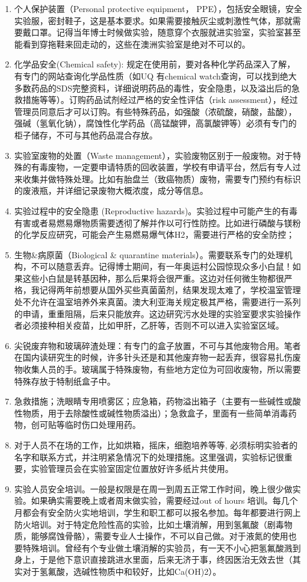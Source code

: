 \documentclass[]{book}
\begin{document}
\begin{enumerate}
\def\labelenumi{\alph{enumi}.}
\item
  个人保护装置（Personal protective equipment， PPE），包括安全眼镜，安全实验服，密封鞋子，这是基本要求。如果需要接触灰尘或刺激性气体，那就需要戴口罩。记得当年博士时候做实验，随意穿个衣服就进实验室，实验室甚至能看到穿拖鞋来回走动的，这些在澳洲实验室是绝对不可以的。
\item
  化学品安全(Chemical safety): 规定在使用前，要对各种化学药品深入了解，有专门的网站查询化学品性质（如UQ 有chemical watch查询，可以找到绝大多数药品的SDS完整资料，详细说明药品的毒性，安全隐患，以及溢出后的急救措施等等）。订购药品试剂经过严格的安全性评估（risk assessment），经过管理员同意后才可以订购。有些特殊药品，如强酸（浓硫酸，硝酸，盐酸），强碱（氢氧化钠），腐蚀性化学药品（高锰酸钾，高氯酸钾等）必须有专门的柜子储存，不可与其他药品混合存放。
\item
  实验室废物的处置（Waste management），实验废物区别于一般废物。对于特殊的有毒废物，一定要申请特质的回收装置，学校有申请平台，然后有专人过来收集并做特殊处理。比如有胎盘兰（致癌物质）废物，需要专门预约有标识的废液瓶，并详细记录废物大概浓度，成分等信息。
\item
  实验过程中的安全隐患 (Reproductive hazards)。实验过程中可能产生的有毒有害或者易燃易爆物质需要透彻了解并作以可行性防控。比如进行磷酸与镁粉的化学反应研究，可能会产生易燃易爆气体H2，需要进行严格的安全防控；
\item
  生物\&病原菌（Biological \& quarantine materials）。需要联系专门的处理机构，不可以随意丢弃。记得博士期间，有一年奥运村公园惊现众多小白鼠！如果这些小白鼠是转基因种，那么后果将会很严重。这边对任何微生物都很严格，我记得两年前想要从国外买些真菌菌剂，结果发现太难了，学校温室管理处不允许在温室培养外来真菌。澳大利亚海关规定极其严格，需要进行一系列的申请，重重阻隔，后来只能放弃。这边研究污水处理的实验室要求实验操作者必须接种相关疫苗，比如甲肝，乙肝等，否则不可以进入实验室区域。
\item
  尖锐废弃物和玻璃碎渣处理：有专门的盒子放置，不可与其他废物合用。笔者在国内读研究生的时候，许多针头还是和其他废弃物一起丢弃，很容易扎伤废物收集人员的手。玻璃属于特殊废物，有些地方定位为可回收废物，所以需要特殊存放于特制纸盒子中。
\item
  急救措施；洗眼睛专用喷雾区；应急箱，药物溢出箱子（主要有一些碱性或酸性物质，用于去除酸性或碱性物质溢出）；急救盒子，里面有一些简单消毒药物，创可贴等临时伤口处理用药。
\item
  对于人员不在场的工作，比如烘箱，摇床，细胞培养等等, 必须标明实验者的名字和联系方式，并注明紧急情况下的处理措施。这里强调，实验标记很重要，实验管理员会在实验室固定位置放好许多纸片共使用。
\item
  实验人员安全培训。一般是权限是在周一到周五正常工作时间，晚上很少做实验。如果确实需要晚上或者周末做实验，需要经过out of hours 培训。每几个月都会有安全防火实地培训，学生和职工都可以报名参加。每年都要进行网上防火培训。对于特定危险性高的实验，比如土壤消解，用到氢氟酸（剧毒物质，能够腐蚀骨骼），需要专业人士操作，不可以自己做。对于液氮的使用也要特殊培训。曾经有个专业做土壤消解的实验员，有一天不小心把氢氟酸溅到身上，于是他下意识直接跳进水里面，后来无济于事，终因医治无效去世（其实对于氢氟酸，选碱性物质中和较好，比如Ca(OH)2）。
\end{enumerate}
\end{document}
